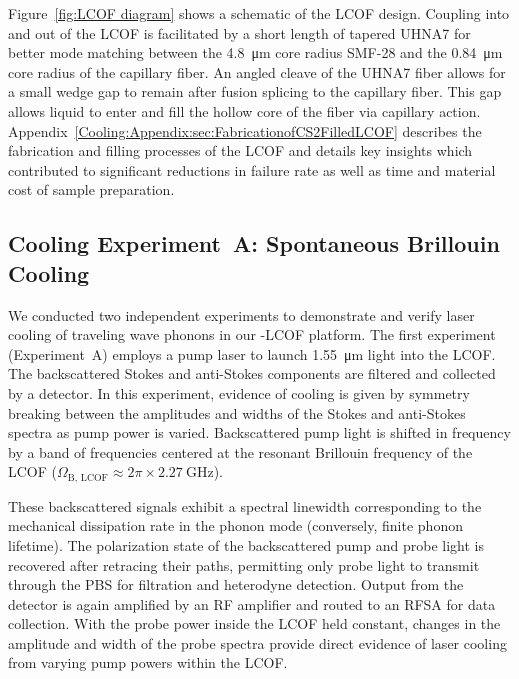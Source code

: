 Figure~\ref{fig:LCOF diagram} shows a schematic of the \ac{LCOF} design. Coupling into and out of the \ac{LCOF} is facilitated by a short length of tapered \ac{UHNA7} for better mode matching between the \SI{4.8}{\micro\meter} core radius \ac{SMF-28} and the \SI{0.84}{\micro\meter} core radius of the capillary fiber. An angled cleave of the \ac{UHNA7} fiber allows for a small wedge gap to remain after fusion splicing to the capillary fiber. This gap allows liquid  to enter and fill the hollow core of the fiber via capillary action. Appendix~\ref{Cooling:Appendix:sec:FabricationofCS2FilledLCOF} describes the fabrication and filling processes of the \ac{LCOF} and details key insights which contributed to significant reductions in failure rate as well as time and material cost of sample preparation.


\subsection{Cooling Experiment~A: Spontaneous Brillouin Cooling}
\label{Cooling:subsec:ExperimentASpontaneousBrillouinCooling}

We conducted two independent experiments to demonstrate and verify laser cooling of traveling wave phonons in our -\ac{LCOF} platform. The first experiment (Experiment~A) employs a pump laser to launch \SI{1.55}{\micro\meter} light into the \ac{LCOF}. The backscattered Stokes and anti-Stokes components are filtered and collected by a detector. In this experiment, evidence of cooling is given by symmetry breaking between the amplitudes and widths of the Stokes and anti-Stokes spectra as pump power is varied. Backscattered pump light is shifted in frequency by a band of frequencies centered at the resonant Brillouin frequency of the \ac{LCOF} (\(\Omega_{\mathrm{B,\,LCOF}} \approx 2\pi\times\SI{2.27}{\giga\hertz}\)).

These backscattered signals exhibit a spectral linewidth corresponding to the mechanical dissipation rate in the phonon mode (conversely, finite phonon lifetime). The polarization state of the backscattered pump and probe light is recovered after retracing their paths, permitting only probe light to transmit through the \ac{PBS} for filtration and heterodyne detection. Output from the detector is again amplified by an \ac{RF} amplifier and routed to an \ac{RFSA} for data collection. With the probe power inside the \ac{LCOF} held constant, changes in the amplitude and width of the probe spectra provide direct evidence of laser cooling from varying pump powers within the \ac{LCOF}.


